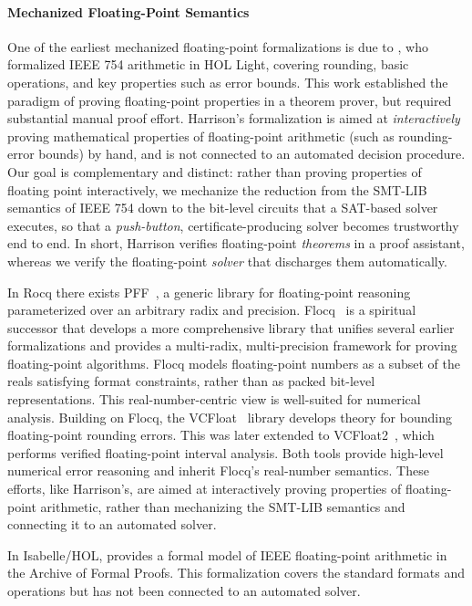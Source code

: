 \paragraph*{Mechanized Floating-Point Semantics}
One of the earliest mechanized floating-point formalizations is due to \citet{harrison1999machine},
who formalized IEEE 754 arithmetic in HOL Light,
covering rounding, basic operations, and key properties such as error bounds.
This work established the paradigm of proving floating-point properties in a theorem prover,
but required substantial manual proof effort.
Harrison's formalization is aimed at \emph{interactively} proving mathematical properties of floating-point arithmetic (such as rounding-error bounds) by hand, and is not connected to an automated decision procedure.
Our goal is complementary and distinct:
rather than proving properties of floating point interactively, we mechanize the reduction from the SMT-LIB semantics of IEEE 754 down to the bit-level circuits that a SAT-based solver executes, so that a \emph{push-button}, certificate-producing solver becomes trustworthy end to end.
In short, Harrison verifies floating-point \emph{theorems} in a proof assistant, whereas we verify the floating-point \emph{solver} that discharges them automatically.

In Rocq there exists PFF~\cite{pff}, a generic library for floating-point reasoning
parameterized over an arbitrary radix and precision. Flocq~\cite{boldo2011flocq} is a spiritual successor that
develops a more comprehensive library that
unifies several earlier formalizations and provides a multi-radix, multi-precision
framework for proving floating-point algorithms.
Flocq models floating-point numbers as a subset of the reals satisfying format constraints,
rather than as packed bit-level representations.
This real-number-centric view is well-suited for numerical analysis.
Building on Flocq, the VCFloat~\cite{appel2022vcfloat} library
develops theory for bounding floating-point rounding errors.
This was later extended to VCFloat2~\cite{kellison2024vcfloat2},
which performs verified floating-point interval analysis.
Both tools provide high-level numerical error reasoning and
inherit Flocq's real-number semantics.
These efforts, like Harrison's, are aimed at interactively proving properties of floating-point arithmetic,
rather than mechanizing the SMT-LIB semantics and connecting it to an automated solver.

In Isabelle/HOL, \citet{isabellefp} provides a formal model of IEEE floating-point arithmetic
in the Archive of Formal Proofs. This formalization covers the standard formats
and operations but has not been connected to an automated solver.

